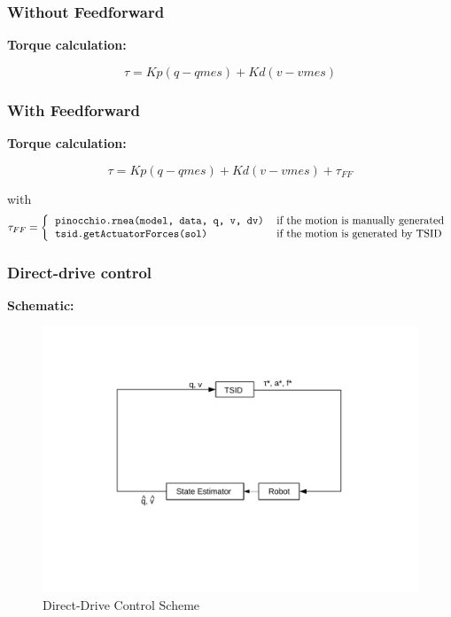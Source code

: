 \documentclass[12pt,a4paper]{article}
\begin{document}
\subsubsection*{Without Feedforward}

\textbf{Torque calculation:}

\begin{equation}
    \tau = Kp (q - qmes) + Kd (v - vmes)
\end{equation}

\subsubsection*{With Feedforward}

\textbf{Torque calculation:}

\begin{equation}
    \tau = Kp (q - qmes) + Kd (v - vmes) + \tau_{FF}
\end{equation}

with
\begin{equation}
    \tau_{FF} = 
    \left\{
    \begin{tabular}{l l}
         \texttt{pinocchio.rnea(model, data, q, v, dv)} & \text{if the motion is manually generated}\\
         \texttt{tsid.getActuatorForces(sol)} & \text{if the motion is generated by TSID} 
    \end{tabular}
    \right.
\end{equation}

\subsubsection{Direct-drive control}

\textbf{Schematic:}

\begin{figure}[ht]
    \centering
    \includegraphics[width=.8\textwidth, trim = 150 180 150 120, clip]{Pics/DTC_scheme.pdf}
    \caption{Direct-Drive Control Scheme}
    \label{fig:ddc_scheme}
\end{figure}
\end{document}
